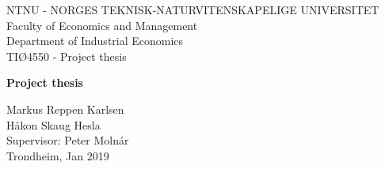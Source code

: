 \begin{titlepage}
\begin{center}
NTNU - NORGES TEKNISK-NATURVITENSKAPELIGE UNIVERSITET\\
Faculty of Economics and Management\\
Department of Industrial Economics\\
TIØ4550 - Project thesis
\end{center}
	
\begin{center}

\vspace * {5cm}
\huge \textbf{Project thesis}

%
%


\vspace * {2cm}

\large
Markus Reppen Karlsen\\
Håkon Skaug Hesla\\
Supervisor: Peter Molnár\\
Trondheim, Jan 2019
\end{center}

\end{titlepage}